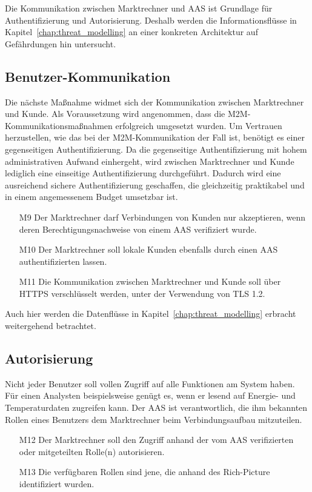 \documentclass[11pt,a4paper]{report}
\begin{document}
Die Kommunikation zwischen Marktrechner und AAS ist Grundlage für Authentifizierung und Autorisierung. Deshalb werden die Informationsflüsse in Kapitel~\ref{chap:threat_modelling} an einer konkreten Architektur auf Gefährdungen hin untersucht.

\subsection{Benutzer-Kommunikation} 
Die nächste Maßnahme widmet sich der Kommunikation zwischen Marktrechner und Kunde. Als Voraussetzung wird angenommen, dass die M2M-Kommunikations\-maßnahmen erfolgreich umgesetzt wurden. Um Vertrauen herzustellen, wie das bei der M2M-Kommunikation der Fall ist, benötigt es einer gegenseitigen Authentifizierung. Da die gegenseitige Authentifizierung mit hohem administrativen Aufwand einhergeht, wird zwischen Marktrechner und Kunde lediglich eine einseitige Authentifizierung durchgeführt. Dadurch wird eine ausreichend sichere Authentifizierung geschaffen, die gleichzeitig praktikabel und in einem angemessenem Budget umsetzbar ist.

\begin{enumerate}
\item[M9] Der Marktrechner darf Verbindungen von Kunden nur akzeptieren, wenn deren Berechtigungsnachweise von einem AAS verifiziert wurde.
\item[M10] Der Marktrechner soll lokale Kunden ebenfalls durch einen AAS authentifizierten lassen.
\item[M11] Die Kommunikation zwischen Marktrechner und Kunde soll über HTTPS verschlüsselt werden, unter der Verwendung von TLS 1.2.
\end{enumerate}

Auch hier werden die Datenflüsse in Kapitel~\ref{chap:threat_modelling} erbracht weitergehend betrachtet.

\subsection{Autorisierung}
Nicht jeder Benutzer soll vollen Zugriff auf alle Funktionen am System haben. Für einen Analysten beispielsweise genügt es, wenn er lesend auf Energie- und Temperaturdaten zugreifen kann. Der AAS ist verantwortlich, die ihm bekannten Rollen eines Benutzers dem Marktrechner beim Verbindungsaufbau mitzuteilen.

\begin{enumerate}
\item[M12] Der Marktrechner soll den Zugriff anhand der vom AAS verifizierten oder mitgeteilten Rolle(n) autorisieren.
\item[M13] Die verfügbaren Rollen sind jene, die anhand des Rich-Picture identifiziert wurden.
\end{enumerate}
\end{document}
